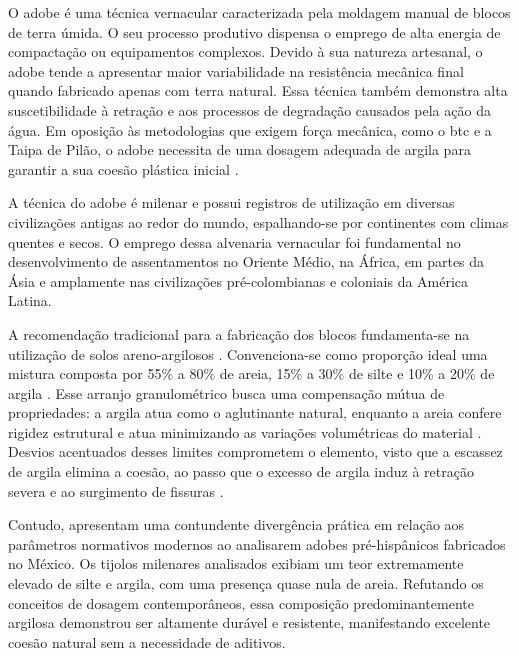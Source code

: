 O adobe é uma técnica vernacular caracterizada pela moldagem manual de blocos de terra úmida. O seu processo produtivo dispensa o emprego de alta energia de compactação ou equipamentos complexos. Devido à sua natureza artesanal, o adobe tende a apresentar maior variabilidade na resistência mecânica final quando fabricado apenas com terra natural. Essa técnica também demonstra alta suscetibilidade à retração e aos processos de degradação causados pela ação da água. Em oposição às metodologias que exigem força mecânica, como o \gls{btc} e a Taipa de Pilão, o adobe necessita de uma dosagem adequada de argila para garantir a sua coesão plástica inicial \cite{MoraRuiz2025}.


A técnica do adobe é milenar e possui registros de utilização em diversas civilizações antigas ao redor do mundo, espalhando-se por continentes com climas quentes e secos. O emprego dessa alvenaria vernacular foi fundamental no desenvolvimento de assentamentos no Oriente Médio, na África, em partes da Ásia e amplamente nas civilizações pré-colombianas e coloniais da América Latina.


A recomendação tradicional para a fabricação dos blocos fundamenta-se na utilização de solos areno-argilosos \cite{Junior2021,Silva2019}. Convenciona-se como proporção ideal uma mistura composta por 55\% a 80\% de areia, 15\% a 30\% de silte e 10\% a 20\% de argila \cite{Junior2021,Rocco2024,Silva2019}. Esse arranjo granulométrico busca uma compensação mútua de propriedades: a argila atua como o aglutinante natural, enquanto a areia confere rigidez estrutural e atua minimizando as variações volumétricas do material \cite{Junior2021,Silva2019}. Desvios acentuados desses limites comprometem o elemento, visto que a escassez de argila elimina a coesão, ao passo que o excesso de argila induz à retração severa e ao surgimento de fissuras \cite{Junior2021, Silva2019}. 

Contudo,  apresentam uma contundente divergência prática em relação aos parâmetros normativos modernos ao analisarem adobes pré-hispânicos fabricados no México. Os tijolos milenares analisados exibiam um teor extremamente elevado de silte e argila, com uma presença quase nula de areia. Refutando os conceitos de dosagem contemporâneos, essa composição predominantemente argilosa demonstrou ser altamente durável e resistente, manifestando excelente coesão natural sem a necessidade de aditivos.


